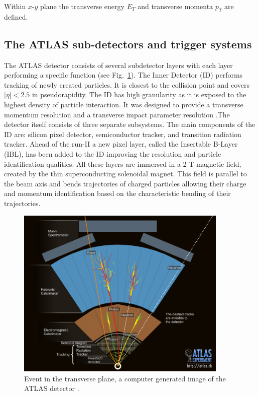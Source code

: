 Within $x$-$y$ plane the transverse energy $E_{T}$ and transverse momenta $p_{T}$ are defined.

\subsection{ The ATLAS sub-detectors and trigger systems}

The ATLAS detector consists of several subdetector layers with each layer performing a specific function (see Fig.~\ref{fig:event}). The Inner Detector (ID) performs tracking of newly created particles. It is closest to the collision point and covers $|\eta|<2.5$ in pseudorapidity. The ID has high granularity as it is exposed to the highest density of particle interaction. It was designed to provide a transverse momentum resolution and a transverse impact parameter resolution \citep{aad2010atlas}.The detector itself consists of three separate subsystems. The main components of the ID are: silicon pixel detector, semiconductor tracker, and transition radiation tracker. Ahead of the run-II a new pixel layer, called the Insertable B-Layer (IBL), has been added to the ID improving the resolution and particle identification qualities. All these layers are immersed in a 2 T magnetic field, created by the thin superconducting solenoidal magnet. This field is parallel to the beam axis and bends trajectories of charged particles allowing their charge and momentum identification based on the characteristic bending of their trajectories. 
\begin{figure}[!h]
	\centering
    \captionsetup{width=0.9\textwidth}
	\includegraphics[width=0.9\textwidth]{Chap2/0803022_01.jpg}
\caption{\label{fig:event} Event in the transverse plane, a computer generated image of the ATLAS detector \cite{event}. }
\end{figure}

